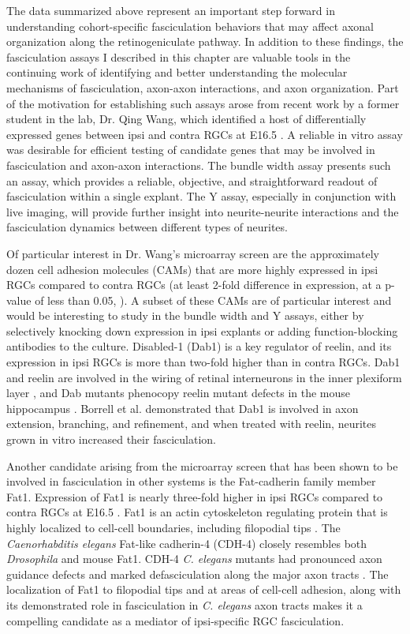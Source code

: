 The data summarized above represent an important step forward in understanding cohort-specific fasciculation behaviors that may affect axonal organization along the retinogeniculate pathway.
In addition to these findings, the fasciculation assays I described in this chapter are valuable tools in the continuing work of identifying and better understanding the molecular mechanisms of fasciculation, axon-axon interactions, and axon organization.
Part of the motivation for establishing such assays arose from recent work by a former student in the lab, Dr. Qing Wang, which identified a host of differentially expressed genes between ipsi and contra RGCs at E16.5 \cite{wang2016ipsilateral}.
A reliable in vitro assay was desirable for efficient testing of candidate genes that may be involved in fasciculation and axon-axon interactions.
The bundle width assay presents such an assay, which provides a reliable, objective, and straightforward readout of fasciculation within a single explant.
The Y assay, especially in conjunction with live imaging, will provide further insight into neurite-neurite interactions and the fasciculation dynamics between different types of neurites.

Of particular interest in Dr. Wang's microarray screen are the approximately dozen cell adhesion molecules (CAMs) that are more highly expressed in ipsi RGCs compared to contra RGCs (at least 2-fold difference in expression, at a p-value of less than 0.05, ).
A subset of these CAMs are of particular interest and would be interesting to study in the bundle width and Y assays, either by selectively knocking down expression in ipsi explants or adding function-blocking antibodies to the culture.
Disabled-1 (Dab1) is a key regulator of reelin, and its expression in ipsi RGCs is more than two-fold higher than in contra RGCs.
Dab1 and reelin are involved in the wiring of retinal interneurons in the inner plexiform layer \cite{rice2001reelin}, and Dab mutants phenocopy reelin mutant defects in the mouse hippocampus \cite{borrell2007reelin}.
Borrell et al.  demonstrated that Dab1 is involved in axon extension, branching, and refinement, and when treated with reelin, neurites grown in vitro increased their fasciculation.

Another candidate arising from the microarray screen that has been shown to be involved in fasciculation in other systems is the Fat-cadherin family member Fat1.
Expression of Fat1 is nearly three-fold higher in ipsi RGCs compared to contra RGCs at E16.5 \cite{wang2016ipsilateral}.
Fat1 is an actin cytoskeleton regulating protein that is highly localized to cell-cell boundaries, including filopodial tips \cite{tanoue2004mammalian}.
The \emph{Caenorhabditis elegans} Fat-like cadherin-4 (CDH-4) closely resembles both \emph{Drosophila} and mouse Fat1.
CDH-4 \emph{C. elegans} mutants had pronounced axon guidance defects and marked defasciculation along the major axon tracts \cite{schmitz2008fat}.
The localization of Fat1 to filopodial tips and at areas of cell-cell adhesion, along with its demonstrated role in fasciculation in \emph{C. elegans} axon tracts makes it a compelling candidate as a mediator of ipsi-specific RGC fasciculation.


